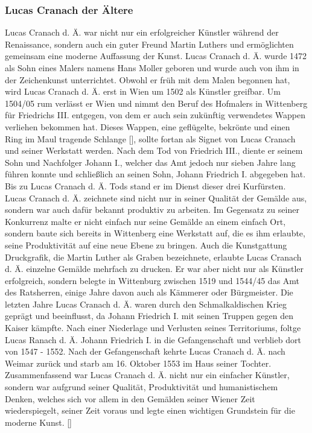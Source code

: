 \documentclass[a4paper,12pt,oneside]{article}
\begin{document}
    \subsubsection{Lucas Cranach der Ältere}
      Lucas Cranach d. Ä. war nicht nur ein erfolgreicher Künstler während der Renaissance,
      sondern auch ein guter Freund Martin Luthers und ermöglichten gemeinsam eine moderne 
      Auffassung der Kunst.
      Lucas Cranach d. Ä. wurde 1472 als Sohn eines Malers namens Hans Moller geboren
      und wurde auch von ihm in der Zeichenkunst unterrichtet.
      Obwohl er früh mit dem Malen begonnen hat, wird Lucas Cranach d. Ä. erst in Wien
      um 1502 als Künstler greifbar. Um 1504/05 rum 
      verlässt er Wien und nimmt den Beruf des Hofmalers in Wittenberg für Friedrichs III. 
      entgegen, von dem er auch sein zukünftig verwendetes Wappen verliehen bekommen 
      hat.
      Dieses Wappen, eine \glqq geflügelte, bekrönte und einen Ring im Maul tragende
      Schlange\grqq{} [\cite[15]{heydenreich2017lucas}], sollte fortan als Signet von
      Lucas Cranach und seiner Werkstatt werden.
      Nach dem Tod von Friedrich III., diente er seinem Sohn und Nachfolger
      Johann I., welcher das Amt jedoch nur sieben Jahre lang führen konnte und
      schließlich an seinen Sohn, Johann Friedrich I. abgegeben hat.
      Bis zu Lucas Cranach d. Ä. Tods stand er im Dienst dieser drei Kurfürsten.
      Lucas Cranach d. Ä. zeichnete sind nicht nur in seiner Qualität der Gemälde aus,
      sondern war auch dafür bekannt produktiv zu arbeiten.
      Im Gegensatz zu seiner Konkurrenz malte er nicht einfach nur seine Gemälde an einem
      einfach Ort, sondern baute sich bereits in Wittenberg eine Werkstatt auf, die es
      ihm erlaubte, seine Produktivität auf eine neue Ebene zu bringen.
      Auch die Kunstgattung Druckgrafik, die Martin Luther als Graben bezeichnete, erlaubte
      Lucas Cranach d. Ä. einzelne Gemälde mehrfach zu drucken.
      Er war aber nicht nur als Künstler erfolgreich, sondern belegte in Wittenburg
      zwischen 1519 und 1544/45 das Amt des Ratsherren, einige Jahre davon auch als
      Kämmerer oder Bürgmeister.
      Die letzten Jahre Lucas Cranach d. Ä. waren durch den Schmalkaldischen Krieg
      geprägt und beeinflusst, da Johann Friedrich I. mit seinen Truppen gegen den
      Kaiser kämpfte. Nach einer Niederlage und
      Verlusten seines Territoriums, foltge Lucas Ranach d. Ä. Johann Friedrich I.
      in die Gefangenschaft und verblieb dort von 1547 - 1552.
      Nach der Gefangenschaft kehrte Lucas Cranach d. Ä. nach Weimar zurück und starb
      am 16. Oktober 1553 im Haus seiner Tochter.
      Zusammenfassend war Lucas Cranach d. Ä. nicht nur ein einfacher Künstler, sondern
      war aufgrund seiner Qualität, Produktivität und humanistischem Denken,
      welches sich vor allem in den Gemälden seiner Wiener Zeit wiederspiegelt,
      seiner Zeit voraus und legte einen wichtigen Grundstein für die moderne
      Kunst. [\cite{heydenreich2017lucas}]
\end{document}
